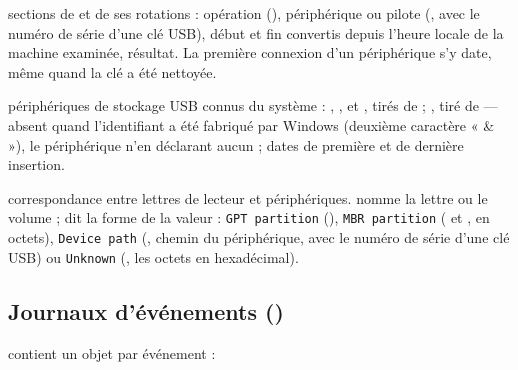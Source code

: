 \documentclass[11pt,a4paper,oneside]{report}
\begin{document}
\begin{description}[style=nextline,leftmargin=1.2em]
  \item[\fichier{setupapi.json}] sections de  et de
        ses rotations : opération (), périphérique ou pilote
        (, avec le numéro de série d'une clé USB), début et fin
        convertis depuis l'heure locale de la machine examinée, résultat. La
        première connexion d'un périphérique s'y date, même quand la clé
         a été nettoyée.
  \item[\fichier{Usbstor.json}] périphériques de stockage USB connus du système :
        , ,  et , tirés
        de  ; , tiré de 
        — absent quand l'identifiant a été fabriqué par Windows (deuxième
        caractère « \& »), le périphérique n'en déclarant aucun ; dates de
        première et de dernière insertion.
  \item[\fichier{mounted\_device.json}] correspondance entre lettres de lecteur et
        périphériques.  nomme la lettre ou le volume ;
         dit la forme de la valeur : \texttt{GPT partition}
        (), \texttt{MBR partition}
        ( et , en octets),
        \texttt{Device path} (, chemin du périphérique, avec le
        numéro de série d'une clé USB) ou \texttt{Unknown} (, les
        octets en hexadécimal).
\end{description}

\subsection{Journaux d'événements ()}

 contient un objet par événement :
\end{document}
